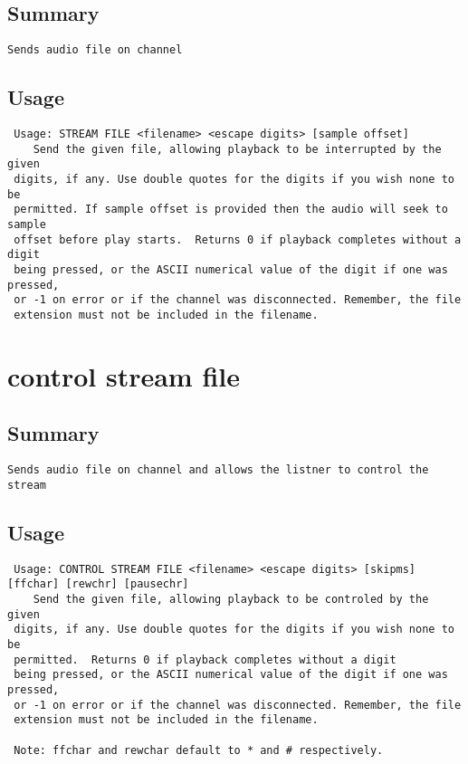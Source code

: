 \subsection{Summary}
\begin{verbatim}
Sends audio file on channel
\end{verbatim}
\subsection{Usage}
\begin{verbatim}
 Usage: STREAM FILE <filename> <escape digits> [sample offset]
	Send the given file, allowing playback to be interrupted by the given
 digits, if any. Use double quotes for the digits if you wish none to be
 permitted. If sample offset is provided then the audio will seek to sample
 offset before play starts.  Returns 0 if playback completes without a digit
 being pressed, or the ASCII numerical value of the digit if one was pressed,
 or -1 on error or if the channel was disconnected. Remember, the file
 extension must not be included in the filename.

\end{verbatim}


\section{control stream file}
\subsection{Summary}
\begin{verbatim}
Sends audio file on channel and allows the listner to control the stream
\end{verbatim}
\subsection{Usage}
\begin{verbatim}
 Usage: CONTROL STREAM FILE <filename> <escape digits> [skipms] [ffchar] [rewchr] [pausechr]
	Send the given file, allowing playback to be controled by the given
 digits, if any. Use double quotes for the digits if you wish none to be
 permitted.  Returns 0 if playback completes without a digit
 being pressed, or the ASCII numerical value of the digit if one was pressed,
 or -1 on error or if the channel was disconnected. Remember, the file
 extension must not be included in the filename.

 Note: ffchar and rewchar default to * and # respectively.

\end{verbatim}



